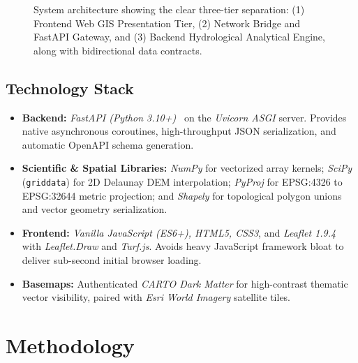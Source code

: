 \documentclass[manuscript,screen,review]{acmart}
\begin{document}
\begin{figure}[H]
{%
  }
  \caption{System architecture showing the clear three-tier separation: (1) Frontend Web GIS Presentation Tier, (2) Network Bridge and FastAPI Gateway, and (3) Backend Hydrological Analytical Engine, along with bidirectional data contracts.}
  \label{fig:architecture}
\end{figure}

\subsection{Technology Stack}
\begin{itemize}
    \item \textbf{Backend:} \emph{FastAPI (Python 3.10+)}~\cite{fastapi2018} on the \emph{Uvicorn ASGI} server. Provides native asynchronous coroutines, high-throughput JSON serialization, and automatic OpenAPI schema generation.
    \item \textbf{Scientific \& Spatial Libraries:} \emph{NumPy} for vectorized array kernels; \emph{SciPy} (\texttt{griddata}) for 2D Delaunay DEM interpolation; \emph{PyProj} for EPSG:4326 to EPSG:32644 metric projection; and \emph{Shapely} for topological polygon unions and vector geometry serialization.
    \item \textbf{Frontend:} \emph{Vanilla JavaScript (ES6+), HTML5, CSS3}, and \emph{Leaflet 1.9.4}~\cite{leaflet2010} with \emph{Leaflet.Draw} and \emph{Turf.js}. Avoids heavy JavaScript framework bloat to deliver sub-second initial browser loading.
    \item \textbf{Basemaps:} Authenticated \emph{CARTO Dark Matter} for high-contrast thematic vector visibility, paired with \emph{Esri World Imagery} satellite tiles.
\end{itemize}

\section{Methodology}
\label{sec:methodology}
\end{document}
